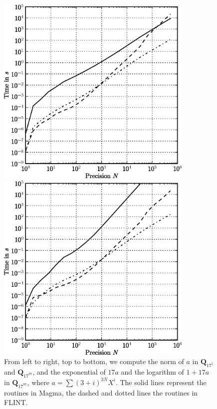 \begin{figure}[ht]
\begin{minipage}[b]{0.5\linewidth}
\centering
\includegraphics[width=0.84\textwidth]{bin/qq-exp}
\end{minipage}
\begin{minipage}[b]{0.5\linewidth}
\centering
\includegraphics[width=0.84\textwidth]{bin/qq-log}
\end{minipage}
\caption{From left to right, top to bottom, we compute the norm 
of $a$ in $\mathbf{Q}_{17^{5}}$ and $\mathbf{Q}_{17^{97}}$, and 
the exponential of $17 a$ and the logarithm of $1 + 17a$ in 
$\mathbf{Q}_{17^{97}}$, where $a = \sum (3+i)^{3N} X^i$.
The solid lines represent the routines in {\sc Magma}, the dashed 
and dotted lines the routines in {\sc FLINT}.}
\label{fig:timings-qq2}
\end{figure}

